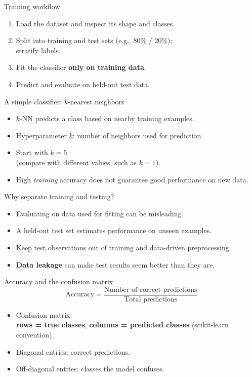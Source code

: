\documentclass[aspectratio=43,11pt]{beamer}
\begin{document}
\begin{frame}{Training workflow}
\begin{enumerate}
  \item Load the dataset and inspect its shape and classes.
  \item Split into training and test sets (e.g., 80\% / 20\%);\\stratify labels.
  \item Fit the classifier \textbf{only on training data}.
  \item Predict and evaluate on held-out test data.
\end{enumerate}
\end{frame}

\begin{frame}{A simple classifier: $k$-nearest neighbors}
\begin{itemize}
  \item $k$-NN predicts a class based on nearby training examples.
  \item Hyperparameter $k$: number of neighbors used for prediction.
  \item Start with $k=5$\\(compare with different values, such as $k=1$).
  \item High \emph{training} accuracy does not guarantee good performance on new data.
\end{itemize}
\end{frame}

\begin{frame}{Why separate training and testing?}
\begin{itemize}
  \item Evaluating on data used for fitting can be misleading.
  \item A held-out test set estimates performance on unseen examples.
  \item Keep test observations out of training and data-driven preprocessing.
  \item \textbf{Data leakage} can make test results seem better than they are.
\end{itemize}
\end{frame}

\begin{frame}{Accuracy and the confusion matrix}
\[
\text{Accuracy}=\frac{\text{Number of correct predictions}}{\text{Total predictions}}
\]
\begin{itemize}
  \item Confusion matrix:\\ \textbf{rows = true classes}, \textbf{columns = predicted classes} (scikit-learn convention).
  \item Diagonal entries: correct predictions.
  \item Off-diagonal entries: classes the model confuses.
\end{itemize}
\end{frame}
\end{document}
